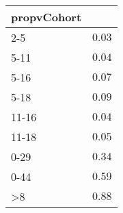 \begin{table}[!tbp]
\begin{center}
\begin{tabular}{lr}
\hline\hline
\multicolumn{1}{l}{propvCohort}&\multicolumn{1}{c}{}\tabularnewline
\hline
2-5&$0.03$\tabularnewline
5-11&$0.04$\tabularnewline
5-16&$0.07$\tabularnewline
5-18&$0.09$\tabularnewline
11-16&$0.04$\tabularnewline
11-18&$0.05$\tabularnewline
0-29&$0.34$\tabularnewline
0-44&$0.59$\tabularnewline
\textgreater8&$0.88$\tabularnewline
\hline
\end{tabular}\end{center}

\end{table}

